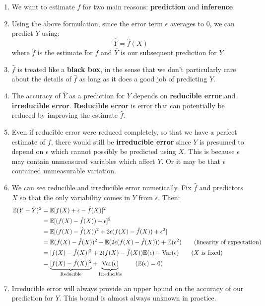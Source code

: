 \documentclass[10pt]{article}
\newcommand{\fhat}{\hat{f}}
\newcommand{\EE}{{\mathbb{E}}}
\begin{document}
\begin{enumerate}
	
	\item We want to estimate $f$ for two main reasons: \textbf{prediction} and \textbf{inference}.
	
	\item Using the above formulation, since the error term $\epsilon$ averages to 0, we can predict $Y$ using:
	$$\hat{Y} = \hat{f}(X)$$
	where $\hat{f}$ is the estimate for $f$ and $\hat{Y}$ is our subsequent prediction for $Y$.
	\item $\hat{f}$ is treated like a \textbf{black box}, in the sense that we don't particularly care about the details of $\hat{f}$ as long as it does a good job of predicting $Y$.
	\item The accuracy of $\hat{Y}$ as a prediction for $Y$ depends on \textbf{reducible error} and \textbf{irreducible error}.  \textbf{Reducible error} is error that can potentially be reduced by improving the estimate $\hat{f}$. 
	\item Even if reducible error were reduced completely, so that we have a perfect estimate of $f$, there would still be \textbf{irreducible error} since $Y$ is presumed to depend on $\epsilon$ which cannot possibly be predicted using $X$.  This is because $\epsilon$ may contain unmeasured variables which affect $Y$.  Or it may be that $\epsilon$ contained unmeasurable variation.
	
	\item We can see reducible and irreducible error numerically.  Fix $\fhat$ and predictors $X$ so that the only variability comes in $Y$ from $\epsilon$.  Then:
	\begin{align*}
	\EE(Y - \hat{Y}) ^2 &= \EE[f(X) + \epsilon - \fhat(X) ]^2 \\
	&= \EE[ (f(X) - \fhat(X)) + \epsilon]^2 \\
	&= \EE[(f(X) - \fhat(X))^2 + 2\epsilon (f(X) - \fhat(X)) + \epsilon^2] \\
	&= \EE(f(X) - \fhat(X))^2 + \EE(2\epsilon (f(X) - \fhat(X))) + \EE(\epsilon^2) \tag{linearity of expectation} \\
	&= [f(X) - \fhat(X)]^2 + 2(f(X) - \fhat(X)) \EE(\epsilon) + {\rm{Var}}(\epsilon) \tag{$X$ is fixed}\\
	&= \underbrace{[f(X) - \fhat(X)]^2}_\text{Reducible}  + \underbrace{{\rm{Var}}(\epsilon)}_\text{Irreducible} \tag{$\EE(\epsilon) = 0$}  
	\end{align*}
	\item Irreducible error will always provide an upper bound on the accuracy of our prediction for $Y$.  This bound is almost always unknown in practice.
	

\end{enumerate}
\end{document}
